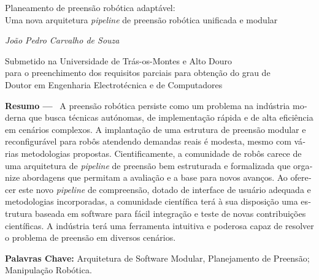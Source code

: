 \begin{otherlanguage}{portuguese}

\begin{center}
\large{Planeamento de preensão robótica adaptável: \\ Uma nova arquitetura \textit{pipeline} de preensão robótica unificada e modular}

\vskip5mm
\normalsize{\textit{João Pedro Carvalho de Souza}}


\vskip5mm
\small{Submetido na Universidade de Trás-os-Montes e Alto Douro \\
para o preenchimento dos requisitos parciais para obtenção do grau de \\
Doutor em Engenharia Electrotécnica e de Computadores}
\end{center}


\textbf{Resumo ---}
\
A preensão robótica persiste como um problema na indústria moderna que busca técnicas autónomas, de implementação rápida e de alta eficiência em cenários complexos. A implantação de uma estrutura de preensão modular e reconfigurável para robôs atendendo demandas reais é modesta, mesmo com várias metodologias propostas. Cientificamente, a comunidade de robôs carece de uma arquitetura de \textit{pipeline} de preensão bem estruturada e formalizada que organize abordagens que permitam a avaliação e a base para novos avanços. Ao oferecer este novo \textit{pipeline} de compreensão, dotado de interface de usuário adequada e metodologias incorporadas, a comunidade científica terá à sua disposição uma estrutura baseada em software para fácil integração e teste de novas contribuições científicas. A indústria terá uma ferramenta intuitiva e poderosa capaz de resolver o problema de preensão em diversos cenários.

\textbf{Palavras Chave:} Arquitetura de Software Modular, Planejamento de Preensão; Manipulação Robótica.

\end{otherlanguage}
